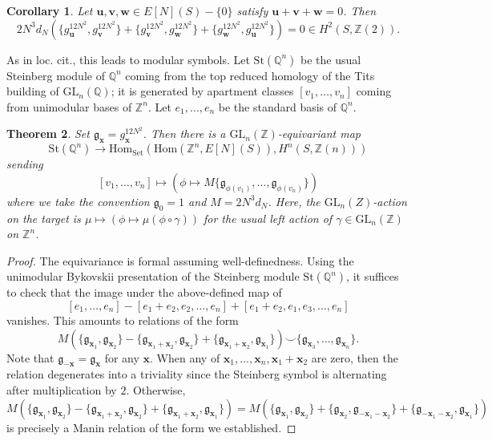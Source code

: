 \documentclass[a4paper,reqno,11pt]{amsart}
\theoremstyle{plain}
\newtheorem{theorem}{Theorem}[section]
\newtheorem{corollary}[theorem]{Corollary}
\theoremstyle{definition}
\theoremstyle{remark}
\newcommand{\Z}{\mathbb{Z}}
\newcommand{\Q}{\mathbb{Q}}
\newcommand{\GL}{\mathrm{GL}}
\newcommand{\Hom}{\mathrm{Hom}}
\begin{document}
\begin{corollary}
Let
$\mathbf{u},\mathbf{v},\mathbf{w}\in E[N](S)-\{0\}$ satisfy $\mathbf{u}+\mathbf{v}+\mathbf{w}=0$.
Then
\[
2N^3d_N
\left(
 \{g_{\mathbf{u}}^{12N^2},g_{\mathbf{v}}^{12N^2}\}
+\{g_{\mathbf{v}}^{12N^2},g_{\mathbf{w}}^{12N^2}\}
+\{g_{\mathbf{w}}^{12N^2},g_{\mathbf{u}}^{12N^2}\}
\right)
=0 \in H^2(S,\Z(2)).
\]
\end{corollary}

As in loc. cit., this leads to modular symbols. Let $\mathrm{St}(\Q^n)$ be the usual Steinberg module of $\Q^n$ coming from the top reduced homology of the Tits building of $\GL_n(\Q)$; it is generated by apartment classes $[v_1,\ldots, v_n]$ coming from unimodular bases of $\Z^n$. Let $e_1,\ldots, e_n$ be the standard basis of $\Q^n$.
\begin{theorem} \label{thm:modnaive}
    Set $\mathfrak{g}_{\mathbf{x}}= g_{\mathbf{x}}^{12N^2}$. Then there is a $\GL_n(\Z)$-equivariant map 
    \[
    \mathrm{St}(\Q^n) \to \Hom_{\mathrm{Set}}(\Hom(\Z^n,E[N](S)), H^n(S,\Z(n)))
    \]
    sending 
    \[
        [v_1,\ldots, v_n]\mapsto (\phi\mapsto M \{ \mathfrak{g}_{\phi(v_1)}, \ldots, \mathfrak{g}_{\phi(v_n)}\})
    \]
    where we take the convention $\mathfrak{g}_{0}=1$ and $M=2N^3d_N$. Here, the $\GL_n(Z)$-action on the target is $\mu \mapsto (\phi \mapsto \mu(\phi \circ \gamma))$ for the usual left action of $\gamma\in \GL_n(\Z)$ on $\Z^n$. 
\end{theorem}
\begin{proof}
    The equivariance is formal assuming well-definedness. Using the unimodular Bykovskii presentation \cite{Byk} of the Steinberg module $\mathrm{St}(\Q^n)$, it suffices to check that the image under the above-defined map of
    \[
    [e_1,\ldots, e_n]- [e_1+e_2,e_2,\ldots, e_n] + [e_1+e_2,e_1,e_3,\ldots, e_n]
    \]
    vanishes. This amounts to relations of the form 
    \[
    M (\{ \mathfrak{g}_{\mathbf{x}_1}, \mathfrak{g}_{\mathbf{x}_2}\} - \{ \mathfrak{g}_{\mathbf{x}_1+\mathbf{x}_2}, \mathfrak{g}_{\mathbf{x}_2}\} + \{ \mathfrak{g}_{\mathbf{x}_1+\mathbf{x}_2}, \mathfrak{g}_{\mathbf{x}_1}\}) \smile \{\mathfrak{g}_{\mathbf{x}_3}, \ldots, \mathfrak{g}_{\mathbf{x}_n}\}.
    \]
    Note that $\mathfrak{g}_{-\mathbf{x}} = \mathfrak{g}_{\mathbf{x}}$ for any $\mathbf{x}$. When any of $\mathbf{x}_1,\ldots, \mathbf{x}_n, \mathbf{x}_1+\mathbf{x}_2$ are zero, then the relation degenerates into a triviality since the Steinberg symbol is alternating after multiplication by $2$. Otherwise, 
    \[
    M (\{ \mathfrak{g}_{\mathbf{x}_1}, \mathfrak{g}_{\mathbf{x}_2}\} - \{ \mathfrak{g}_{\mathbf{x}_1+\mathbf{x}_2}, \mathfrak{g}_{\mathbf{x}_2}\} + \{ \mathfrak{g}_{\mathbf{x}_1+\mathbf{x}_2}, \mathfrak{g}_{\mathbf{x}_1}\})  = M (\{ \mathfrak{g}_{\mathbf{x}_1}, \mathfrak{g}_{\mathbf{x}_2}\} +\{\mathfrak{g}_{\mathbf{x}_2}, \mathfrak{g}_{-\mathbf{x}_1-\mathbf{x}_2} \} + \{ \mathfrak{g}_{-\mathbf{x}_1-\mathbf{x}_2}, \mathfrak{g}_{\mathbf{x}_1}\})  
    \]
    is precisely a Manin relation of the form we established.
\end{proof}
\end{document}
